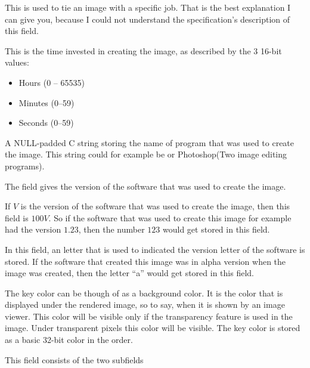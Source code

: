 
This is used to tie an image with a specific job. That is the best
explanation I can give you, because I could not understand the \tga
specification's description of this field.


This is the time invested in creating the image, as described by the 3
16-bit values:

\begin{itemize}
\item Hours (0 -- 65535)
\item Minutes (0--59)
\item Seconds (0--59)
\end{itemize}


A NULL-padded C string storing the name of program that was used to
create the image. This string could for example be \gimp or
Photoshop(Two image editing programs).


The field gives the version of the software that was used to create
the image.


If $V$ is the version of the software that was used to create the
image, then this field is $100V$. So if the software that was
used to create this image for example had the version $1.23$, then the
number $123$ would get stored in this field.


In this field, an \ascii letter that is used to indicated the version
letter of the software is stored. If the software that created this
image was in alpha version when the image was created, then the \ascii
letter ``a'' would get stored in this field.


The key color can be though of as a background color. It is the color
that is displayed under the rendered image, so to say, when it is
shown by an image viewer. This color will be visible only if the
transparency feature is used in the image. Under transparent pixels
this color will be visible. The key color is stored as a basic 32-bit
color in the \argb order.


This field consists of the two subfields

